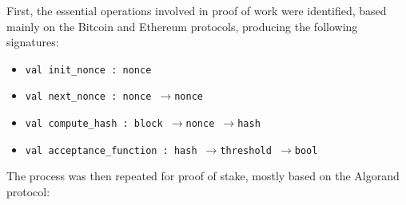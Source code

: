 \vspace{0.2cm}

First, the essential operations involved in proof of work were identified, based mainly on the Bitcoin \cite{bitcoin} and Ethereum \cite{ethereum_whitepaper} protocols, producing the following signatures:

\begin{itemize}
    \itemsep0em
    \item \texttt{val init\_nonce : nonce}
    \item \texttt{val next\_nonce : nonce $\rightarrow{}$nonce}
    \item \texttt{val compute\_hash : block $\rightarrow{}$nonce $\rightarrow{}$hash}
    \item \texttt{val acceptance\_function : hash $\rightarrow{}$threshold $\rightarrow{}$bool}
\end{itemize}


The process was then repeated for proof of stake, mostly based on the Algorand \cite{algorand_scale_byz_agreements} protocol:

